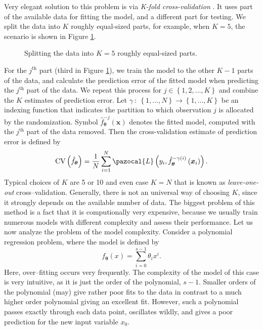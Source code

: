 Very elegant solution to this problem is via \emph{K-fold cross-validation} \cite{statistics}. It
uses part of the available data for fitting the model, and a different
part for testing. We split the data into $K$ roughly equal-sized parts, for
example, when $K = 5$, the scenario is shown in Figure \ref{fig:KFOLD}. 
\begin{figure}[h]
\begin{center}
\end{center}
\caption{Splitting the data into $K=5$ roughly equal-sized parts.}
\label{fig:KFOLD}
\end{figure}
For the $j^{\mathrm{th}}$ part (third in Figure \ref{fig:KFOLD}), we train the model to the other $K-1$ parts
of the data, and calculate the prediction error of the fitted model when
predicting the $j^{\mathrm{th}}$ part of the data. We repeat this process for $j \in \left\lbrace 1,2,\dots,K\right\rbrace$ and
combine the $K$ estimates of prediction error. Let $\gamma~:~\left\lbrace 1,\dots,N\right\rbrace\rightarrow  \left\lbrace 1,\dots,K\right\rbrace$ be an indexing
function that indicates the partition to which observation $j$ is allocated by
the randomization. Symbol $\hat{f}_{\boldsymbol{\theta}}^{-j}\left(\boldsymbol{x}\right)$ denotes the fitted model, computed with
the $j^{\mathrm{th}}$ part of the data removed. Then the cross-validation estimate of
prediction error is defined by
\begin{equation}
\mathrm{CV}\left(\hat{f}_{\boldsymbol{\theta}}\right) = \frac{1}{N}\sum_{i = 1}^{N}\pazocal{L}\left(y_i , \hat{f}_{\boldsymbol{\theta}}^{-\gamma\left(i\right)}\left(\boldsymbol{x}_i\right)\right).
\end{equation}
Typical choices of $K$ are 5 or 10 and even case $K = N$ that is known as \emph{leave-one-out} cross--validation. Generally, there is not an universal way of choosing $K$, since it strongly depends on the available number of data. 
The biggest problem of this method is a fact that it is computionally very expensive, because we usually train numerous models with different complexity and assess their performance. Let us now analyze the problem of the model complexity. Consider a polynomial regression problem,  where the model is defined by
\begin{equation}
	f_{\boldsymbol{\theta}}(x) = \sum_{i=0}^{s-1}\theta_ix^i.
\end{equation}
 Here, over--fitting occurs very frequently. The complexity of the model of this case is very intuitive, as it is just the order of the polynomial, $s-1$.  Smaller orders of the polynomial (may) give rather poor fits to the data in contrast to a much higher order polynomial giving an excellent fit. However, such a polynomial passes exactly through each data point, oscillates wildly, and gives a poor prediction for the new input variable $x_{0}$. 
 
